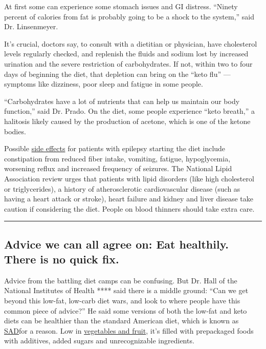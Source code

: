 At first some can experience some stomach issues and GI distress.
``Ninety percent of calories from fat is probably going to be a shock to
the system,'' said Dr. Linsenmeyer.

It's crucial, doctors say, to consult with a dietitian or physician,
have cholesterol levels regularly checked, and replenish the fluids and
sodium lost by increased urination and the severe restriction of
carbohydrates. If not, within two to four days of beginning the diet,
that depletion can bring on the ``keto flu'' --- symptoms like
dizziness, poor sleep and fatigue in some people.

``Carbohydrates have a lot of nutrients that can help us maintain our
body function,'' said Dr. Prado. On the diet, some people experience
``keto breath,'' a halitosis likely caused by the production of acetone,
which is one of the ketone bodies.

Possible
\href{https://www.epilepsybehavior.com/article/S1525-5050(11)00112-0/abstract}{side
effects} for patients with epilepsy starting the diet include
constipation from reduced fiber intake, vomiting, fatigue, hypoglycemia,
worsening reflux and increased frequency of seizures. The National Lipid
Association review urges that patients with lipid disorders (like high
cholesterol or triglycerides), a history of atherosclerotic
cardiovascular disease (such as having a heart attack or stroke), heart
failure and kidney and liver disease take caution if considering the
diet. People on blood thinners should take extra care.

\begin{center}\rule{0.5\linewidth}{\linethickness}\end{center}

\hypertarget{advice-we-can-all-agree-on-eat-healthily-there-is-no-quick-fix}{%
\subsection{Advice we can all agree on: Eat healthily. There is no quick
fix.}\label{advice-we-can-all-agree-on-eat-healthily-there-is-no-quick-fix}}

Advice from the battling diet camps can be confusing. But Dr. Hall of
the National Institutes of Health **** said there is a middle ground:
``Can we get beyond this low-fat, low-carb diet wars, and look to where
people have this common piece of advice?'' He said some versions of both
the low-fat and keto diets can be healthier than the standard American
diet, which is known as
\href{https://www.nytimes3xbfgragh.onion/2019/04/26/books/review/self-help-diet-weight-good-health.html}{SAD}for
a reason. Low in
\href{https://health.gov/dietaryguidelines/2015/guidelines/chapter-1/}{vegetables
and fruit}, it's filled with prepackaged foods with additives, added
sugars and unrecognizable ingredients.

